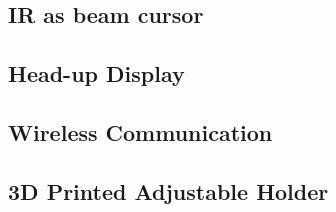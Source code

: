 \subsection{IR as beam cursor}
\label{sec:ir-as-beam}

\subsection{Head-up Display}
\label{sec:head-up-display}

\subsection{Wireless Communication}
\label{sec:wirel-comm}

\subsection{3D Printed Adjustable Holder}
\label{sec:3d-print-adjust}




